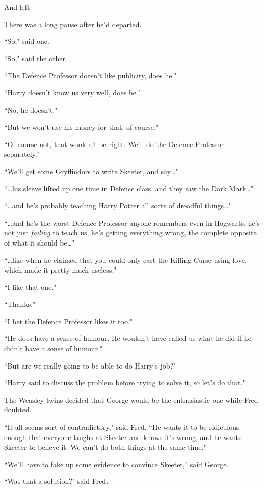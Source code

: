 And left.

There was a long pause after he'd departed.

``So," said one.

``So," said the other.

``The Defence Professor doesn't like publicity, does he."

``Harry doesn't know us very well, does he."

``No, he doesn't."

``But we won't use his money for that, of course."

``Of course not, that wouldn't be right. We'll do the Defence Professor separately."

``We'll get some Gryffindors to write Skeeter, and say{\ldots}"

``{\ldots}his sleeve lifted up one time in Defence class, and they saw the Dark Mark{\ldots}"

``{\ldots}and he's probably teaching Harry Potter all sorts of dreadful things{\ldots}"

``{\ldots}and he's the worst Defence Professor anyone remembers even in Hogwarts, he's not just \emph{failing} to teach us, he's getting everything wrong, the complete opposite of what it should be{\ldots}"

``{\ldots}like when he claimed that you could only cast the Killing Curse using love, which made it pretty much useless."

``I like that one."

``Thanks."

``I bet the Defence Professor likes it too."

``He does have a sense of humour. He wouldn't have called us what he did if he didn't have a sense of humour."

``But are we really going to be able to do Harry's job?"

``Harry said to discuss the problem before trying to solve it, so let's do that."

The Weasley twins decided that George would be the enthusiastic one while Fred doubted.

``It all seems sort of contradictory," said Fred. ``He wants it to be ridiculous enough that everyone laughs at Skeeter and knows it's wrong, and he wants Skeeter to believe it. We can't do both things at the same time."

``We'll have to fake up some evidence to convince Skeeter," said George.

``Was that a solution?" said Fred.

